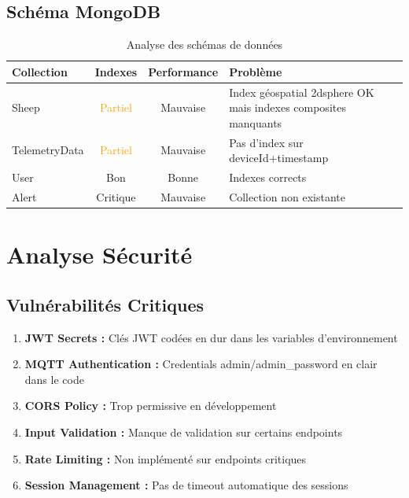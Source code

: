 \documentclass[a4paper,12pt]{article}
\begin{document}
\subsection{Schéma MongoDB}

\begin{table}[h]
\centering
\begin{tabular}{|l|c|c|p{4cm}|}
\hline
\textbf{Collection} & \textbf{Indexes} & \textbf{Performance} & \textbf{Problème} \\
\hline
Sheep & \textcolor{orange}{Partiel} & \textcolor{alertred}{Mauvaise} & Index géospatial 2dsphere OK mais indexes composites manquants \\
\hline
TelemetryData & \textcolor{orange}{Partiel} & \textcolor{alertred}{Mauvaise} & Pas d'index sur deviceId+timestamp \\
\hline
User & \textcolor{accentgreen}{Bon} & \textcolor{accentgreen}{Bonne} & Indexes corrects \\
\hline
Alert & \textcolor{alertred}{Critique} & \textcolor{alertred}{Mauvaise} & Collection non existante \\
\hline
\end{tabular}
\caption{Analyse des schémas de données}
\end{table}

\section{Analyse Sécurité}

\subsection{Vulnérabilités Critiques}

\begin{tcolorbox}[colback=alertred!10, colframe=alertred, title={\faIcon{shield-alt} Vulnérabilités de Sécurité}]
\begin{enumerate}
    \item \textbf{JWT Secrets :} Clés JWT codées en dur dans les variables d'environnement
    \item \textbf{MQTT Authentication :} Credentials admin/admin_password en clair dans le code
    \item \textbf{CORS Policy :} Trop permissive en développement
    \item \textbf{Input Validation :} Manque de validation sur certains endpoints
    \item \textbf{Rate Limiting :} Non implémenté sur endpoints critiques
    \item \textbf{Session Management :} Pas de timeout automatique des sessions
\end{enumerate}
\end{tcolorbox}
\end{document}
